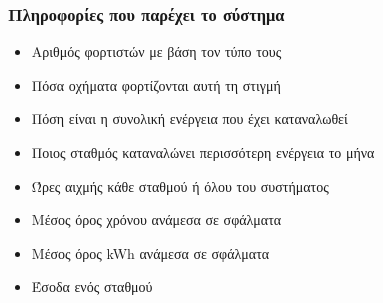 \documentclass[10pt]{beamer}
\begin{document}



\begin{frame}
    \frametitle{Πληροφορίες που παρέχει το σύστημα}

    \begin{itemize}
        \item Αριθμός φορτιστών με βάση τον τύπο τους
        \item Πόσα οχήματα φορτίζονται αυτή τη στιγμή
        \item Πόση είναι η συνολική ενέργεια που έχει καταναλωθεί
        \item Ποιος σταθμός καταναλώνει περισσότερη ενέργεια το μήνα
        \item Ώρες αιχμής κάθε σταθμού ή όλου του συστήματος
        \item Μέσος όρος χρόνου ανάμεσα σε σφάλματα
        \item Μέσος όρος kWh ανάμεσα σε σφάλματα
        \item Έσοδα ενός σταθμού

    \end{itemize}
\end{frame}
\end{document}
